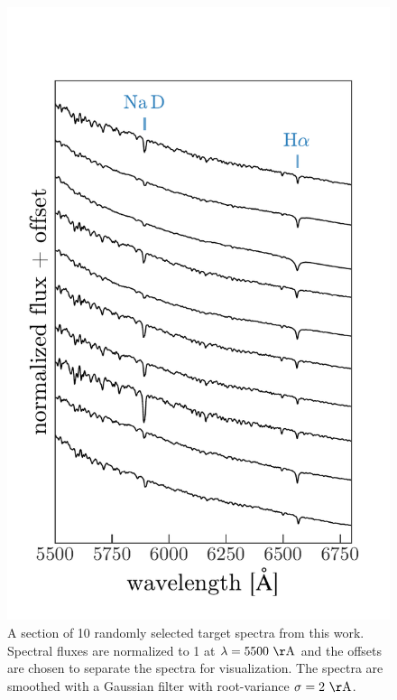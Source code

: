 \documentclass[modern, letterpaper]{aastex61}
\begin{document}
\begin{figure}[htbp]
  \begin{center}
    \includegraphics[width=0.9\linewidth]{sample_spectra.pdf}
  \end{center}
  \caption{%
    A section of 10 randomly selected target spectra from this work.
    Spectral fluxes are normalized to 1 at $\lambda = 5500~{\rm \AA}$ and the
    offsets are chosen to separate the spectra for visualization.
    The spectra are smoothed with a Gaussian filter with root-variance $\sigma
    = 2~{\rm \AA}$.
    \label{fig:sample-spectra}}
\end{figure}
\end{document}
